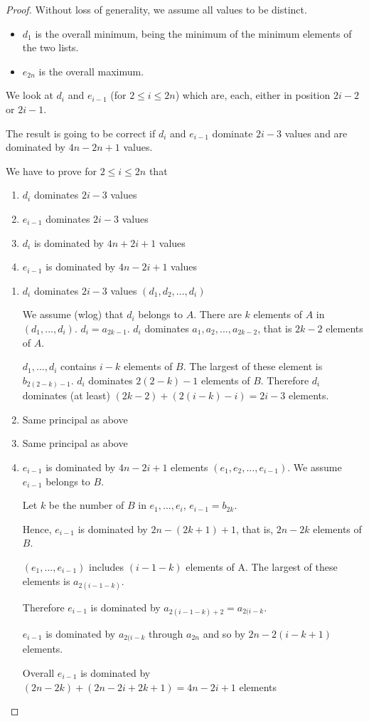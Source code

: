 \begin{proof}
Without loss of generality, we assume all values to be distinct.
\begin{itemize}
\item $d_1$ is the overall minimum, being the minimum of the minimum elements of the two lists.
\item $e_{2n}$ is the overall maximum.
\end{itemize}
 We look at $d_i$ and $e_{i-1}$ (for $2\leq i\leq 2n$) which are, each, either in position $2i-2$ or $2i-1$.

The result is going to be correct if $d_i$ and $e_{i-1}$ dominate $2i-3$ values and are dominated by $4n-2n+1$ values.

We have to prove for $2\leq i \leq 2n$ that 
\begin{enumerate}
\item $d_i$ dominates $2i-3$ values
\item $e_{i-1}$ dominates $2i-3$ values
\item $d_i$ is dominated by $4n+ 2i + 1$ values
\item $e_{i-1}$ is dominated by $4n - 2i + 1$ values
\end{enumerate}

\begin{enumerate}
\item $d_i$ dominates $2i-3$ values $(d_1,d_2,...,d_i)$

We assume (wlog) that $d_i$ belongs to $A$. There are $k$ elements of $A$ in $(d_1,...,d_i)$. $d_i=a_{2k-1}$. $d_i$ dominates $a_1, a_2,...,a_{2k-2}$, that is $2k-2$ elements of $A$.

$d_1,...,d_i$ contains $i-k$ elements of $B$. The largest of these element is $b_{2(2-k)-1}$. $d_i$ dominates $2(2-k)-1$ elements of $B$. Therefore $d_i$ dominates (at least) $(2k-2) + (2 (i-k)-i) = 2i - 3$ elements.
\item Same principal as above
\item Same principal as above
\item $e_{i-1}$ is dominated by $4n - 2i + 1$ elements $(e_1,e_2,...,e_{i-1})$. We assume $e_{i-1}$ belongs to $B$.

Let $k$ be the number of $B$ in $e_1,...,e_i$, $e_{i-1}=b_{2k}$.

Hence, $e_{i-1}$ is dominated by $2n-(2k+1)+1$, that is, $2n-2k$ elements of $B$.

$(e_1,...,e_{i-1})$ includes $(i-1-k)$ elements of A. The largest of these elements is $a_{2(i-1-k)}$.

Therefore $e_{i-1}$ is dominated by $a_{2(i-1-k)+2}=a_{2(i-k}$. 

$e_{i-1}$ is dominated by $a_{2(i-k}$ through $a_{2n}$ and so by $2n-2(i-k+1)$ elements.

Overall $e_{i-1}$ is dominated by $(2n-2k)+(2n-2i+2k+1)=4n-2i+1$ elements
\end{enumerate}
\end{proof}


